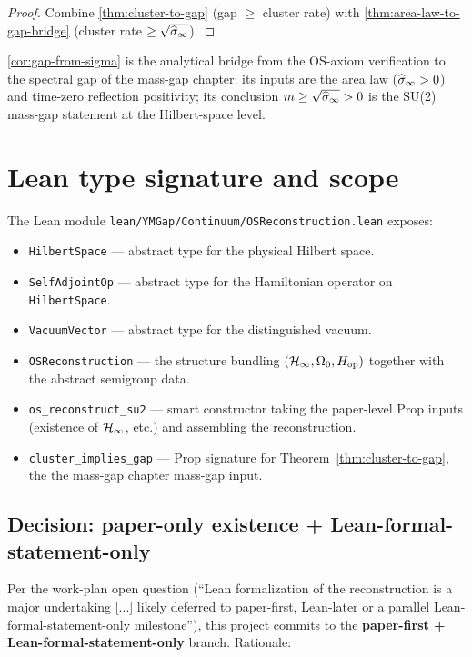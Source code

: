 \begin{proof}
Combine \cref{thm:cluster-to-gap} (gap $\ge$ cluster rate) with
\cref{thm:area-law-to-gap-bridge} (cluster rate $\ge \sqrt{\widehat{\sigma}_\infty}$).
\end{proof}

\cref{cor:gap-from-sigma} is the analytical bridge from the OS-axiom
verification to the spectral gap of the mass-gap chapter: its inputs
are the area law ($\widehat{\sigma}_\infty > 0$) and time-zero reflection positivity;
its conclusion $m \ge \sqrt{\widehat{\sigma}_\infty} > 0$ is the SU(2) mass-gap
statement at the Hilbert-space level.

\section{Lean type signature and scope}
\label{sec:lean-signature}

The Lean module \texttt{lean/YMGap/Continuum/OSReconstruction.lean}
exposes:
\begin{itemize}
  \item \texttt{HilbertSpace} — abstract type for the physical
    Hilbert space.
  \item \texttt{SelfAdjointOp} — abstract type for the Hamiltonian
    operator on \texttt{HilbertSpace}.
  \item \texttt{VacuumVector} — abstract type for the
    distinguished vacuum.
  \item \texttt{OSReconstruction} — the structure bundling
    $(\mathcal{H}_\infty, \Omega_0, H_{\mathrm{op}})$ together with the abstract
    semigroup data.
  \item \texttt{os\_reconstruct\_su2} — smart constructor taking
    the paper-level Prop inputs (existence of $\mathcal{H}_\infty$, etc.) and
    assembling the reconstruction.
  \item \texttt{cluster\_implies\_gap} — Prop signature for
    Theorem~\ref{thm:cluster-to-gap}, the the mass-gap chapter mass-gap input.
\end{itemize}

\subsection*{Decision: paper-only existence + Lean-formal-statement-only}

Per the work-plan  open question (``Lean formalization
of the reconstruction is a major undertaking [...] likely deferred
to paper-first, Lean-later or a parallel Lean-formal-statement-only
milestone''), this project commits to the \textbf{paper-first +
Lean-formal-statement-only} branch.  Rationale:


